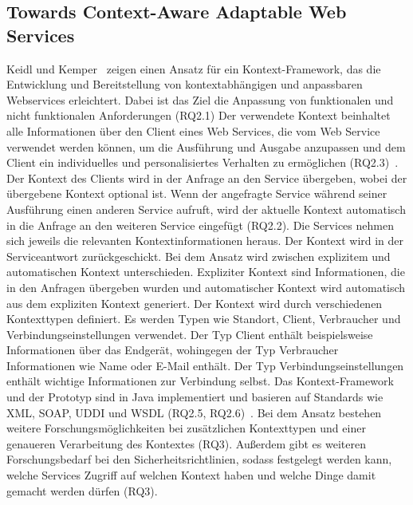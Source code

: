 \documentclass[conference,compsoc,ngerman]{IEEEtran}
\begin{document}
\subsection{Towards Context-Aware Adaptable Web Services}
Keidl und Kemper~\cite{keidl2004towards} zeigen einen Ansatz für ein Kontext-Framework, das die Entwicklung und Bereitstellung von kontextabhängigen und anpassbaren Webservices erleichtert. Dabei ist das Ziel die Anpassung von funktionalen und nicht funktionalen Anforderungen (RQ2.1)
Der verwendete Kontext beinhaltet alle Informationen über den Client eines Web Services, die vom Web Service verwendet werden können, um die Ausführung und Ausgabe anzupassen und dem Client ein individuelles und personalisiertes Verhalten zu ermöglichen (RQ2.3)~\cite{keidl2004towards}. Der Kontext des Clients wird in der Anfrage an den Service übergeben, wobei der übergebene Kontext optional ist. Wenn der angefragte Service während seiner Ausführung einen anderen Service aufruft, wird der aktuelle Kontext automatisch in die Anfrage an den weiteren Service eingefügt (RQ2.2). Die Services nehmen sich jeweils die relevanten Kontextinformationen heraus. Der Kontext wird in der Serviceantwort zurückgeschickt.
Bei dem Ansatz wird zwischen explizitem und automatischen Kontext unterschieden. Expliziter Kontext sind Informationen, die in den Anfragen übergeben wurden und automatischer Kontext wird automatisch aus dem expliziten Kontext generiert.
Der Kontext wird durch verschiedenen Kontexttypen definiert. Es werden Typen wie Standort, Client, Verbraucher und Verbindungseinstellungen verwendet. Der Typ Client enthält beispielsweise Informationen über das Endgerät, wohingegen der Typ Verbraucher Informationen wie Name oder E-Mail enthält. Der Typ Verbindungseinstellungen enthält wichtige Informationen zur Verbindung selbst.
Das Kontext-Framework und der Prototyp sind in Java implementiert und basieren auf Standards wie XML, SOAP, UDDI und WSDL (RQ2.5, RQ2.6)~\cite{keidl2004towards}.
Bei dem Ansatz bestehen weitere Forschungsmöglichkeiten bei zusätzlichen Kontexttypen und einer genaueren Verarbeitung des Kontextes (RQ3). Außerdem gibt es weiteren Forschungsbedarf bei den Sicherheitsrichtlinien, sodass festgelegt werden kann, welche Services Zugriff auf welchen Kontext haben und welche Dinge damit gemacht werden dürfen (RQ3).
\end{document}
